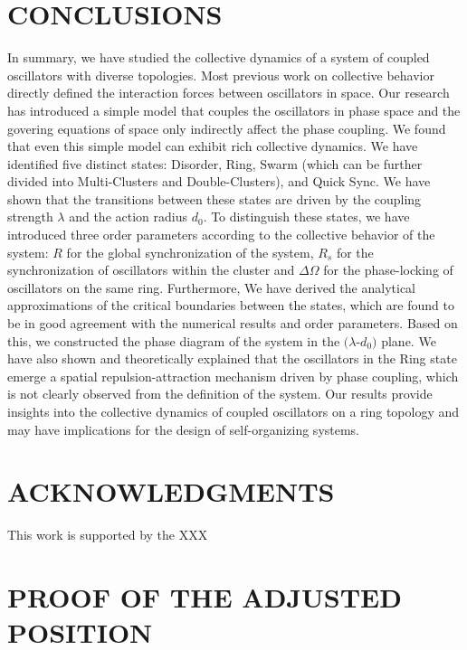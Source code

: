 \documentclass[%
 aip,
 amsmath,amssymb,
 reprint,%
]{revtex4-1}
\begin{document}
\section{\label{sec:conclusions}CONCLUSIONS}

In summary, we have studied the collective dynamics of a system of coupled oscillators with diverse topologies. 
Most previous work on collective behavior directly defined the interaction forces between oscillators in space. Our research has introduced a simple model that couples the oscillators in phase space and the govering equations of space only indirectly affect the phase coupling. We found that even this simple model can exhibit rich collective dynamics.
We have identified five distinct states: Disorder, Ring, Swarm (which can be further divided into Multi-Clusters and Double-Clusters), and Quick Sync. 
We have shown that the transitions between these states are driven by the coupling strength $\lambda$ and the action radius $d_0$. 
To distinguish these states, we have introduced three order parameters according to the collective behavior of the system: $R$ for the global synchronization of the system, $R_s$ for the synchronization of oscillators within the cluster and $\Delta\Omega$ for the phase-locking of oscillators on the same ring.
Furthermore, We have derived the analytical approximations of the critical boundaries between the states, which are found to be in good agreement with the numerical results and order parameters. Based on this, we constructed the phase diagram of the system in the $(\lambda$-$d_0)$ plane.
We have also shown and theoretically explained that the oscillators in the Ring state emerge a spatial repulsion-attraction mechanism driven by phase coupling, which is not clearly observed from the definition of the system.
Our results provide insights into the collective dynamics of coupled oscillators on a ring topology and may have implications for the design of self-organizing systems.

\section{ACKNOWLEDGMENTS}

This work is supported by the XXX

\appendix

\section{\label{sec:adj_pos} PROOF OF THE ADJUSTED POSITION}
\end{document}
